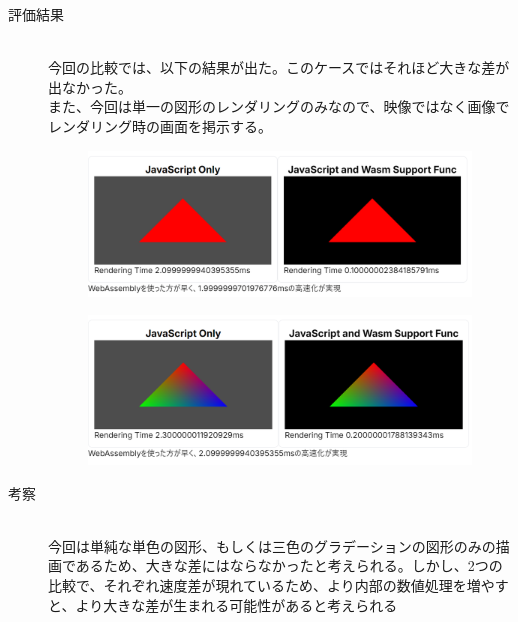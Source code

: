 \begin{description}
	\item[評価結果]~\\
	今回の比較では、以下の結果が出た。このケースではそれほど大きな差が出なかった。\\
	また、今回は単一の図形のレンダリングのみなので、映像ではなく画像でレンダリング時の画面を掲示する。
	\begin{figure}[h]
		\centering
		\begin{minipage}[b]{0.49\columnwidth}
			\centering
			\includegraphics[width=0.9\columnwidth]{normal_triangle.png}
			\label{fig:a}
		\end{minipage}
		\begin{minipage}[b]{0.49\columnwidth}
			\centering
			\includegraphics[width=0.9\columnwidth]{colorful_triangle.png}
			\label{fig:b}
		\end{minipage}
	\end{figure}
	\newpage
	\item[考察]~\\
	今回は単純な単色の図形、もしくは三色のグラデーションの図形のみの描画であるため、大きな差にはならなかったと考えられる。しかし、2つの比較で、それぞれ速度差が現れているため、より内部の数値処理を増やすと、より大きな差が生まれる可能性があると考えられる
	
\end{description}


